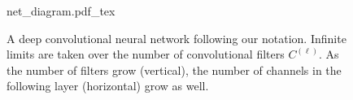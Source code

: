 \documentclass{article}
\theoremstyle{definition}
\newcommand{\vX}{\mathbf{X}}
\newcommand{\vW}{\mathbf{W}}
\newcommand{\vZ}{\mathbf{Z}}
\newcommand{\vA}{\mathbf{A}}
\begin{document}
\newcommand{\layerC}[1]{C^{(#1)}}
\newcommand{\layerw}[1]{P^{#1}}
\newcommand{\layerh}[1]{Q^{#1}}
\newcommand{\layersize}[1]{\layerw{#1}\cdot\layerh{#1}}
\newcommand{\patchw}[1]{p^{(#1)}}
\newcommand{\patchh}[1]{q^{(#1)}}
\newcommand{\patchsize}[1]{\patchw{#1}\patchh{#1}}
\newcommand{\patchidx}{q}
\newcommand{\W}[1]{\vW}
\newcommand{\layerWs}[1]{W^{(#1)}}
\newcommand{\layerW}[1]{\vW^{(#1)}}
\newcommand{\priorWcov}[1]{\boldsymbol{\Sigma}^{(#1)}}
\newcommand{\priorWcovs}[1]{\Sigma^{(#1)}}
\newcommand{\layerA}[2]{\mathbf{Z}^{(#1)}_{#2}(\vX)}
\newcommand{\layerAd}[2]{\mathbf{Z}^{(#1)}_{#2}(\vX')}
\newcommand{\layerAs}[2]{Z^{\!(#1)}_{#2}\!(\vX)}
\newcommand{\layerAsd}[2]{Z^{\!(#1)}_{#2}\!(\vX')}
\newcommand{\layerNLAs}[2]{A^{\!#1}_{#2}(\vX)}
\newcommand{\layerNLAsd}[2]{A^{\!#1}_{#2}(\vX')}
\newcommand{\layerNLA}[2]{\vA^{\!#1}_{#2}\!(\vX)}
\newcommand{\layerNLAd}[2]{\vA^{\!#1}_{#2}\!(\vX')}
\newcommand{\chan}{c}
\newcommand{\prevchan}{\gamma}   %
\newcommand{\patch}{p}               %
\newcommand{\nextpatch}{\mu}





\begin{figure}[b]
  \centering
{\renewcommand{\layerAs}[1]{\vZ^{(#1)}}
  {net_diagram.pdf_tex}}
  \caption{A deep convolutional neural network following our notation. Infinite limits are taken over the number of convolutional filters $\layerC{\ell}$. As the number of filters grow (vertical), the number of channels in the following layer (horizontal) grow as well.}
  \label{fig:fancy-cnn}
\end{figure}
\end{document}
